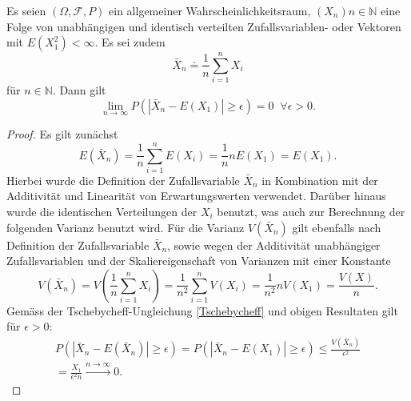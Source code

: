 \documentclass[a4paper,12pt]{article}
\begin{document}
\begin{tn}\label{SchwachesGesetzdergrossenZahlen}
	Es seien $(\Omega, \mathcal{F},P)$ ein allgemeiner Wahrscheinlichkeitsraum, $(X_n){n \in \mathbb{N}}$ eine Folge von unabhängigen und identisch verteilten Zufallsvariablen- oder Vektoren mit $E(X_1^2) < \infty$. Es sei zudem \begin{equation}
		\bar{X}_n \doteq \frac{1}{n}\sum_{i=1}^{n}X_i
	\end{equation} für $n \in \mathbb{N}$. Dann gilt \begin{equation}
	\lim\limits_{n \rightarrow \infty} P(|\bar{X}_n-E(X_1)| \geq \epsilon) = 0 \;\; \forall \epsilon > 0.
\end{equation}
\end{tn}
\begin{proof}
	Es gilt zunächst \begin{equation}
		E(\bar{X}_n) = \frac{1}{n}\sum_{i=1}^{n}E(X_i) = \frac{1}{n}n E(X_1) = E(X_1).
	\end{equation} Hierbei wurde die Definition der Zufallsvariable $\bar{X}_n$ in Kombination mit der Additivität und Linearität von Erwartungswerten verwendet. Darüber hinaus wurde die identischen Verteilungen der $X_i$ benutzt, was auch zur Berechnung der folgenden Varianz benutzt wird. Für die Varianz $V(\bar{X}_n)$ gilt ebenfalls nach Definition der Zufallsvariable $\bar{X}_n$, sowie wegen der Additivität unabhängiger Zufallsvariablen und der Skaliereigenschaft von Varianzen mit einer Konstante \begin{equation}
	V(\bar{X}_n) = V(\frac{1}{n}\sum_{i=1}^{n}X_i) = \frac{1}{n^2}\sum_{i=1}^{n}V(X_i) = \frac{1}{n^2}nV(X_1) = \frac{V(X)}{n}.
\end{equation} Gemäss der Tschebycheff-Ungleichung \ref{Tschebycheff} und obigen Resultaten gilt für $\epsilon >0:$ \begin{gather}\label{betrepsilon}
P(|\bar{X}_n-E(\bar{X}_n)|\geq \epsilon) = P(|\bar{X}_n-E(X_1)|\geq \epsilon) \leq \frac{V(\bar{X}_n)}{\epsilon^2} \nonumber \\ = \frac{X_1}{\epsilon^2 n} \xrightarrow{n \rightarrow \infty} 0.
\end{gather}
\end{proof}
\end{document}
